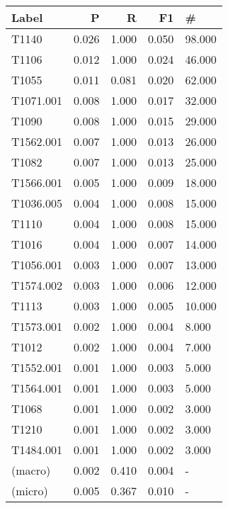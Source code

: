 \begin{tabular}{lrrrl}
    \toprule
    Label     & P     & R     & F1    & \#     \\
    \midrule
    T1140     & 0.026 & 1.000 & 0.050 & 98.000 \\
    T1106     & 0.012 & 1.000 & 0.024 & 46.000 \\
    T1055     & 0.011 & 0.081 & 0.020 & 62.000 \\
    T1071.001 & 0.008 & 1.000 & 0.017 & 32.000 \\
    T1090     & 0.008 & 1.000 & 0.015 & 29.000 \\
    T1562.001 & 0.007 & 1.000 & 0.013 & 26.000 \\
    T1082     & 0.007 & 1.000 & 0.013 & 25.000 \\
    T1566.001 & 0.005 & 1.000 & 0.009 & 18.000 \\
    T1036.005 & 0.004 & 1.000 & 0.008 & 15.000 \\
    T1110     & 0.004 & 1.000 & 0.008 & 15.000 \\
    T1016     & 0.004 & 1.000 & 0.007 & 14.000 \\
    T1056.001 & 0.003 & 1.000 & 0.007 & 13.000 \\
    T1574.002 & 0.003 & 1.000 & 0.006 & 12.000 \\
    T1113     & 0.003 & 1.000 & 0.005 & 10.000 \\
    T1573.001 & 0.002 & 1.000 & 0.004 & 8.000  \\
    T1012     & 0.002 & 1.000 & 0.004 & 7.000  \\
    T1552.001 & 0.001 & 1.000 & 0.003 & 5.000  \\
    T1564.001 & 0.001 & 1.000 & 0.003 & 5.000  \\
    T1068     & 0.001 & 1.000 & 0.002 & 3.000  \\
    T1210     & 0.001 & 1.000 & 0.002 & 3.000  \\
    T1484.001 & 0.001 & 1.000 & 0.002 & 3.000 \\
    (macro)   & 0.002 & 0.410 & 0.004 & - \\
    (micro)   & 0.005 & 0.367 & 0.010 & -      \\
    \bottomrule
\end{tabular}
